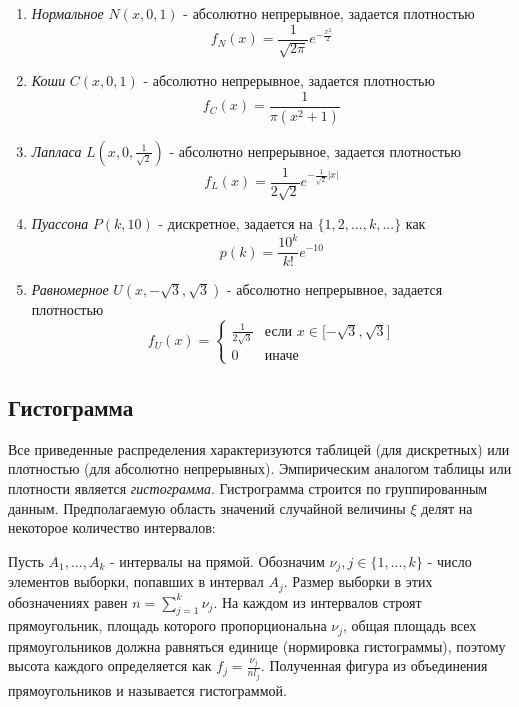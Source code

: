 \documentclass[12pt,a4paper]{article}
\begin{document}
\begin{enumerate}
	\item \textit{Нормальное} $N(x, 0, 1)$ - абсолютно непрерывное, задается плотностью
	\begin{equation}
	f_N(x)=\frac{1}{\sqrt{2\pi}}e^{-\frac{x^2}{2}}
	\end{equation}
	
	\item \textit{Коши} $C(x, 0, 1)$ - абсолютно непрерывное, задается плотностью
	\begin{equation}
	f_C(x)=\frac{1}{\pi(x^2+1)}
	\end{equation}
	
	\item \textit{Лапласа} $L(x, 0, \frac{1}{\sqrt{2}})$ - абсолютно непрерывное, задается плотностью
	\begin{equation}
	f_L(x)=\frac{1}{2\sqrt{2}}e^{-\frac{1}{\sqrt{2}}|x|}
	\end{equation}
	
	\item \textit{Пуассона} $P(k, 10)$ - дискретное, задается на $\{1, 2, ..., k, ...\}$ как
	\begin{equation}
	p(k)=\frac{10^k}{k!}e^{-10}
	\end{equation} 
	
	\item \textit{Равномерное} $U(x, -\sqrt{3}, \sqrt{3})$ - абсолютно непрерывное, задается плотностью 
	\begin{equation}
	f_U(x) = 
	\begin{cases}
	\frac{1}{2\sqrt{3}} &\text{если $x \in \mathopen[-\sqrt{3}, \sqrt{3}\mathclose] $}\\
	0 &\text{иначе}
	\end{cases}
	\end{equation}	
\end{enumerate}

\subsection{Гистограмма}
Все приведенные распределения характеризуются таблицей (для дискретных) или плотностью (для абсолютно непрерывных). Эмпирическим аналогом таблицы или плотности является \textit{гистограмма}\cite{chernova}. Гистрограмма строится по группированным данным. Предполагаемую область значений случайной величины $\xi$ делят на некоторое количество интервалов:

Пусть $A_1, ..., A_k$ - интервалы на прямой. Обозначим $\nu_j,j\in\{1, ..., k\}$ - число элементов выборки, попавших в интервал $A_j$. Размер выборки в этих обозначениях равен $n=\sum\limits_{j=1}^{k}{\nu_j}$. На каждом из интервалов строят прямоугольник, площадь которого пропорциональна $\nu_j$, общая площадь всех прямоугольников должна равняться единице (нормировка гистограммы), поэтому высота каждого определяется как $f_j=\frac{\nu_j}{nl_j}$. Полученная фигура из объединения прямоугольников и называется гистограммой.
\pagebreak
\end{document}
